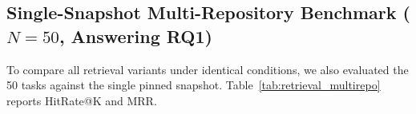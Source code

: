 \documentclass[conference]{IEEEtran}
\begin{document}
\begin{table}[!t]
\caption{Fault Localization with Task-Specific Checkouts (Static Hybrid RRF)}
\label{tab:chrono}
\centering
\setlength{\tabcolsep}{3.5pt}
\end{table}

\subsection{Single-Snapshot Multi-Repository Benchmark ($N=50$, Answering RQ1)}
To compare all retrieval variants under identical conditions, we also evaluated the 50 tasks against the single pinned snapshot. Table~\ref{tab:retrieval_multirepo} reports HitRate@K and MRR.
\end{document}
